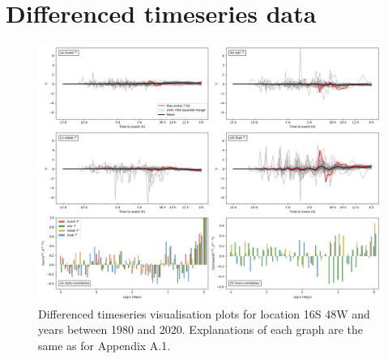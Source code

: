 \section{Differenced timeseries data}

\begin{figure}[h]
\includegraphics[width=\textwidth]{images/sup_diff.png}
\caption{Differenced timeseries visualisation plots for location 16S 48W and years between 1980 and 2020. Explanations of each graph are the same as for Appendix A.1.}
\end{figure}

